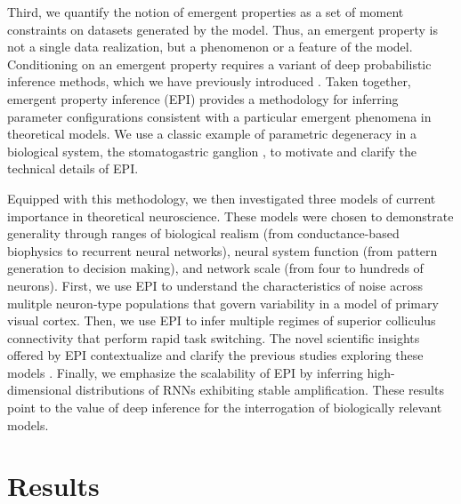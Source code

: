 \documentclass[11pt]{article}
\begin{document}
Third, we quantify the notion of emergent properties as a set of moment constraints on datasets generated by the model.  
Thus, an emergent property is not a single data realization, but a phenomenon or a feature of the model.
Conditioning on an emergent property requires a variant of deep probabilistic inference methods, which we have previously introduced \cite{loaiza2017maximum}.
Taken together, emergent property inference (EPI) provides a methodology for inferring parameter configurations consistent with a particular emergent phenomena in theoretical models.
We use a classic example of parametric degeneracy in a biological system, the stomatogastric ganglion \cite{goldman2001global}, to motivate and clarify the technical details of EPI.

Equipped with this methodology, we then investigated three models of current importance in theoretical neuroscience.
These models were chosen to demonstrate generality through ranges of biological realism (from conductance-based biophysics to recurrent neural networks), neural system function (from pattern generation to decision making), and network scale (from four to hundreds of neurons).
First, we use EPI to understand the characteristics of noise across mulitple neuron-type populations that govern variability in a model of primary visual cortex.
Then, we use EPI to infer multiple regimes of superior colliculus connectivity that perform rapid task switching.
The novel scientific insights offered by EPI contextualize and clarify the previous studies exploring these models \cite{litwin2016inhibitory, duan2018collicular}.
Finally, we emphasize the scalability of EPI by inferring high-dimensional distributions of RNNs exhibiting stable amplification.
These results point to the value of deep inference for the interrogation of biologically relevant models.



\section{Results}
\end{document}
